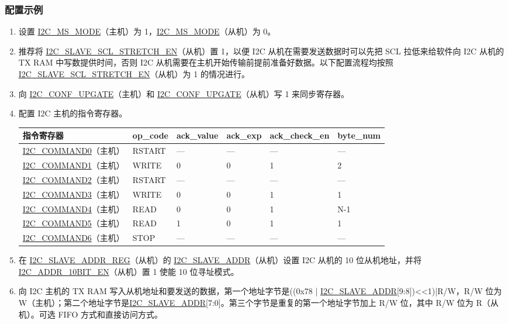 \documentclass[main\_\_CN.tex]{subfiles}
\begin{document}
\subsubsection{配置示例}
\begin{enumerate}
\item 设置 \hyperref[fielddesc:I2CMSMODE]{I2C\_MS\_MODE}（主机）为 1，\hyperref[fielddesc:I2CMSMODE]{I2C\_MS\_MODE}（从机）为 0。
\item 推荐将 \hyperref[fielddesc:I2CSLAVESCLSTRETCHEN]{I2C\_SLAVE\_SCL\_STRETCH\_EN}（从机）置 1，以便 I2C 从机在需要发送数据时可以先把 SCL 拉低来给软件向 I2C 从机的 TX RAM 中写数提供时间，否则 I2C 从机需要在主机开始传输前提前准备好数据。以下配置流程均按照\hyperref[fielddesc:I2CSLAVESCLSTRETCHEN]{I2C\_SLAVE\_SCL\_STRETCH\_EN}（从机）为 1 的情况进行。
\item 向 \hyperref[fielddesc:I2CCONFUPGATE]{I2C\_CONF\_UPGATE}（主机）和 \hyperref[fielddesc:I2CCONFUPGATE]{I2C\_CONF\_UPGATE}（从机）写 1 来同步寄存器。
\item 配置 I2C 主机的指令寄存器。
\begin{longtable}{ | p{4cm} | p{2cm} | p{2cm} | p{2cm} |p{2cm} | p{2cm} |}
\hline\rowcolor{lightgray}
指令寄存器& op\_code & ack\_value&ack\_exp&ack\_check\_en&byte\_num  \\ \hline
\hyperref[fielddesc:I2CCOMMAND0]{I2C\_COMMAND0}（主机）& RSTART& ---&---&---&---  \\ \hline
\hyperref[fielddesc:I2CCOMMAND1]{I2C\_COMMAND1}（主机）& WRITE& 0&0&1&2  \\ \hline
\hyperref[fielddesc:I2CCOMMAND2]{I2C\_COMMAND2}（主机）& RSTART& ---&---&---&---  \\ \hline
\hyperref[fielddesc:I2CCOMMAND3]{I2C\_COMMAND3}（主机）& WRITE& 0&0&1&1  \\ \hline
\hyperref[fielddesc:I2CCOMMAND4]{I2C\_COMMAND4}（主机）& READ& 0&0&1&N-1  \\ \hline
\hyperref[fielddesc:I2CCOMMAND5]{I2C\_COMMAND5}（主机）& READ& 1&0&1&1  \\ \hline
\hyperref[fielddesc:I2CCOMMAND6]{I2C\_COMMAND6}（主机）& STOP& ---&---&---&---  \\ \hline
\end{longtable}

\item 在 \hyperref[regdesc:I2CSLAVEADDRREG]{I2C\_SLAVE\_ADDR\_REG}（从机）的 \hyperref[fielddesc:I2CSLAVEADDR]{I2C\_SLAVE\_ADDR}（从机）设置 I2C 从机的 10 位从机地址，并将 \hyperref[fielddesc:I2CADDR10BITEN]{I2C\_ADDR\_10BIT\_EN}（从机）置 1 使能 10 位寻址模式。
\item 向 I2C 主机的 TX RAM 写入从机地址和要发送的数据，第一个地址字节是((0x{}78 | \hyperref[fielddesc:I2CSLAVEADDR]{I2C\_SLAVE\_ADDR}[9:8])<<1)|R/W，R/W 位为 W（主机）；第二个地址字节是\hyperref[fielddesc:I2CSLAVEADDR]{I2C\_SLAVE\_ADDR}[7:0]。第三个字节是重复的第一个地址字节加上 R/W 位，其中 R/W 位为 R（从机）。可选 FIFO 方式和直接访问方式。


\end{enumerate}
\end{document}
